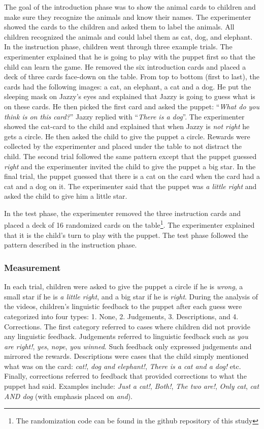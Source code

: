 \documentclass[10pt, letterpaper]{article}
\begin{document}
The goal of the introduction phase was to show the animal cards to
children and make sure they recognize the animals and know their names.
The experimenter showed the cards to the children and asked them to
label the animals. All children recognized the animals and could label
them as cat, dog, and elephant. In the instruction phase, children went
through three example trials. The experimenter explained that he is
going to play with the puppet first so that the child can learn the
game. He removed the six introduction cards and placed a deck of three
cards face-down on the table. From top to bottom (first to last), the
cards had the following images: a cat, an elephant, a cat and a dog. He
put the sleeping mask on Jazzy's eyes and explained that Jazzy is going
to guess what is on these cards. He then picked the first card and asked
the puppet: ``\emph{What do you think is on this card?}'' Jazzy replied
with ``\emph{There is a dog}''. The experimenter showed the cat-card to
the child and explained that when Jazzy is \emph{not right} he gets a
circle. He then asked the child to give the puppet a circle. Rewards
were collected by the experimenter and placed under the table to not
distract the child. The second trial followed the same pattern except
that the puppet guessed \emph{right} and the experimenter invited the
child to give the puppet a big star. In the final trial, the puppet
guessed that there is a cat on the card when the card had a cat and a
dog on it. The experimenter said that the puppet was \emph{a little
right} and asked the child to give him a little star.

In the test phase, the experimenter removed the three instruction cards
and placed a deck of 16 randomized cards on the
table\footnote{The randomization code can be found in the github repository of this study}.
The experimenter explained that it is the child's turn to play with the
puppet. The test phase followed the pattern described in the instruction
phase.

\subsubsection{Measurement}\label{measurement-1}

In each trial, children were asked to give the puppet a circle if he is
\emph{wrong}, a small star if he is \emph{a little right}, and a big
star if he is \emph{right}. During the analysis of the videos,
children's linguistic feedback to the puppet after each guess were
categorized into four types: 1. None, 2. Judgements, 3. Descriptions,
and 4. Corrections. The first category referred to cases where children
did not provide any linguistic feedback. Judgements referred to
linguistic feedback such as \emph{you are right!}, \emph{yes},
\emph{nope}, \emph{you winned}. Such feedback only expressed judgements
and mirrored the rewards. Descriptions were cases that the child simply
mentioned what was on the card: \emph{cat!}, \emph{dog and elephant!},
\emph{There is a cat and a dog!} etc. Finally, corrections referred to
feedback that provided corrections to what the puppet had said. Examples
include: \emph{Just a cat!}, \emph{Both!}, \emph{The two are!},
\emph{Only cat}, \emph{cat AND dog} (with emphasis placed on
\emph{and}).
\end{document}
